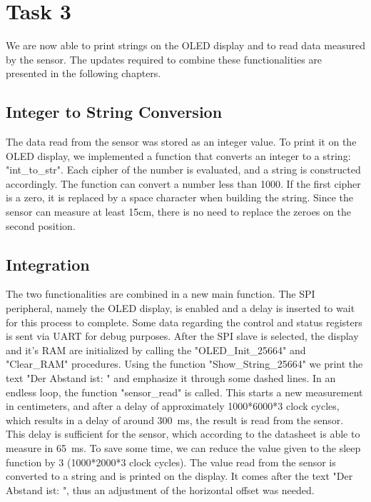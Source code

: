 	\section{Task 3} %
	\label{sec:impl_task_3}
		We are now able to print strings on the OLED display and to read data measured by the sensor. The updates required to combine these functionalities are presented in the following chapters.
		
		\subsection{Integer to String Conversion} %
		\label{sub:integer_to_string_conversion}
			The data read from the sensor was stored as an integer value. To print it on the OLED display, we implemented a function that converts an integer to a string: "int\_to\_str". Each cipher of the number is evaluated, and a string is constructed accordingly. The function can convert a number less than 1000. If the first cipher is a zero, it is replaced by a space character when building the string. Since the sensor can measure at least 15cm, there is no need to replace the zeroes on the second position.  

		\subsection{Integration} %
		\label{sub:integration}
			The two functionalities are combined in a new main function. The SPI peripheral, namely the OLED display, is enabled and a delay is inserted to wait for this process to complete. Some data regarding the control and status registers is sent via UART for debug purposes. After the SPI slave is selected, the display and it’s RAM are initialized by calling the "OLED\_Init\_25664" and "Clear\_RAM" procedures. Using the function "Show\_String\_25664" we print the text "Der Abstand ist: " and emphasize it through some dashed lines. 
			In an endless loop, the function "sensor\_read" is called. This starts a new measurement in centimeters, and after a delay of approximately 1000*6000*3 clock cycles, which results in a delay of around \SI{300}{\milli\second}, the result is read from the sensor. This delay is sufficient for the sensor, which according to the datasheet is able to measure in \SI{65}{\milli\second}. To save some time, we can reduce the value given to the sleep function by 3 (1000*2000*3 clock cycles). The value read from the sensor is converted to a string and is printed on the display. It comes after the text "Der Abstand ist: ", thus an adjustment of the horizontal offset was needed.

